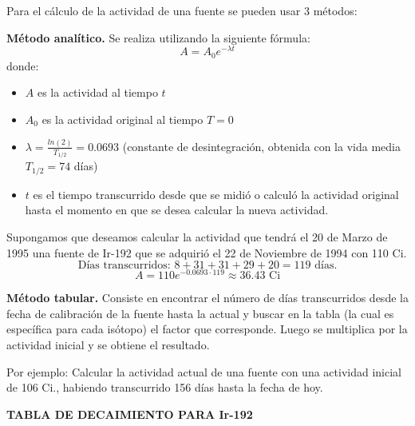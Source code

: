 
Para el cálculo de la actividad de una fuente se pueden usar 3 métodos:

\textbf{Método analítico.} Se realiza utilizando la siguiente fórmula:
\[
A = A_0 e^{-\lambda t}
\]
donde:
\begin{itemize}
    \item $A$ es la actividad al tiempo $t$
    \item $A_0$ es la actividad original al tiempo $T=0$
    \item $\lambda = \frac{ln(2)}{T_{1/2}} = 0.0693$ (constante de desintegración, obtenida con la vida media $T_{1/2} = 74$ días)
    \item $t$ es el tiempo transcurrido desde que se midió o calculó la actividad original hasta el momento en que se desea calcular la nueva actividad.
\end{itemize}

Supongamos que deseamos calcular la actividad que tendrá el 20 de Marzo de 1995 una fuente de Ir-192 que se adquirió el 22 de Noviembre de 1994 con 110 Ci. 
\[
\text{Días transcurridos: } 8 + 31 + 31 + 29 + 20 = 119 \text{ días.}
\]
\[
A = 110 e^{-0.0693 \cdot 119} \approx 36.43 \text{ Ci}
\]

\textbf{Método tabular.} Consiste en encontrar el número de días transcurridos desde la fecha de calibración de la fuente hasta la actual y buscar en la tabla (la cual es específica para cada isótopo) el factor que corresponde. Luego se multiplica por la actividad inicial y se obtiene el resultado.

Por ejemplo: Calcular la actividad actual de una fuente con una actividad inicial de 106 Ci., habiendo transcurrido 156 días hasta la fecha de hoy.

\textbf{TABLA DE DECAIMIENTO PARA Ir-192}

